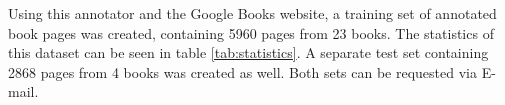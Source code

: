 Using this annotator and the Google Books website, a training set of annotated
book pages was created, containing 5960 pages from 23 books. The statistics of
this dataset can be seen in table \ref{tab:statistics}. A separate test set
containing 2868 pages from 4 books was created as well. Both sets can be
requested via E-mail.


